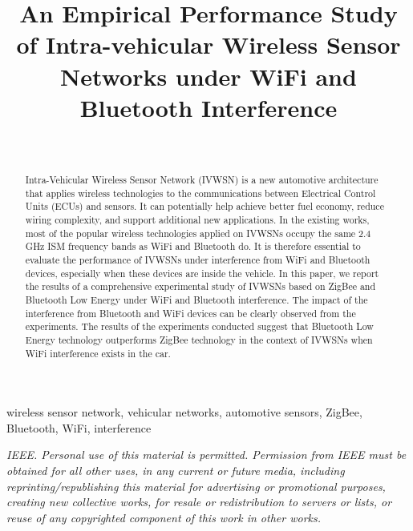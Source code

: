 \documentclass[journal]{IEEEtran}
\begin{document}
\title{An Empirical Performance Study of Intra-vehicular Wireless Sensor Networks under WiFi and Bluetooth Interference}

\author{\\
}\maketitle

\begin{abstract}
Intra-Vehicular Wireless Sensor Network (IVWSN) is a new automotive architecture that applies wireless technologies to the communications between Electrical Control Units (ECUs) and sensors. It can potentially help achieve better fuel economy, reduce wiring complexity, and support additional new applications. In the existing works, most of the popular wireless technologies applied on IVWSNs occupy the same 2.4 GHz ISM frequency bands as WiFi and Bluetooth do. It is therefore essential to evaluate the performance of IVWSNs under interference from WiFi and Bluetooth devices, especially when these devices are inside the vehicle.
In this paper, we report the results of a comprehensive experimental study of IVWSNs based on ZigBee and Bluetooth Low Energy under WiFi and Bluetooth interference. The impact of the interference from Bluetooth and WiFi devices can be clearly observed from the experiments. The results of the experiments conducted suggest that Bluetooth Low Energy technology outperforms ZigBee technology in the context of IVWSNs when WiFi interference exists in the car. 
\end{abstract}

\begin{IEEEkeywords}
wireless sensor network, vehicular networks, automotive sensors, ZigBee, Bluetooth, WiFi, interference
\end{IEEEkeywords}

\IEEEpeerreviewmaketitle

{\small \textsl{ IEEE. Personal use of this material is permitted. Permission from IEEE must be
obtained for all other uses, in any current or future media, including
reprinting/republishing this material for advertising or promotional purposes, creating new
collective works, for resale or redistribution to servers or lists, or reuse of any copyrighted
component of this work in other works.}}
\end{document}
